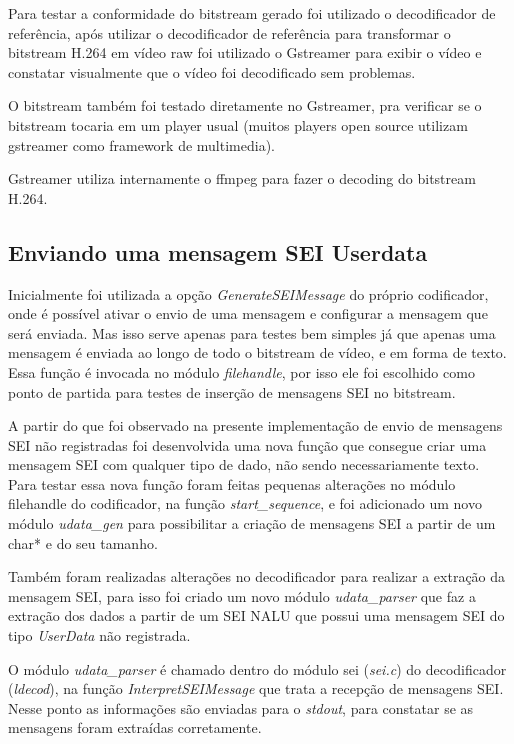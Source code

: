 Para testar a conformidade do bitstream gerado foi utilizado o decodificador de referência, após utilizar o decodificador de referência para transformar o bitstream H.264 em vídeo raw foi utilizado o Gstreamer para exibir o vídeo e constatar visualmente que o vídeo foi decodificado sem problemas.

O bitstream também foi testado diretamente no Gstreamer, pra verificar se o bitstream tocaria em um player usual (muitos players open source utilizam gstreamer como framework de multimedia). 

Gstreamer utiliza internamente o ffmpeg para fazer o decoding do bitstream H.264. 


\subsection{Enviando uma mensagem SEI Userdata}

Inicialmente foi utilizada a opção \textit{GenerateSEIMessage} do próprio codificador, onde é possível ativar o envio de uma mensagem e configurar a mensagem que será enviada. Mas isso serve apenas para testes bem simples já que apenas uma mensagem é enviada ao longo de todo o bitstream de vídeo, e em forma de texto. Essa função é invocada no módulo \textit{filehandle}, por isso ele foi escolhido como ponto de partida para testes de inserção de mensagens SEI no bitstream.

A partir do que foi observado na presente implementação de envio de mensagens SEI não registradas foi desenvolvida uma nova função que consegue criar uma mensagem SEI com qualquer tipo de dado, não sendo necessariamente texto. Para testar essa nova função foram feitas pequenas alterações no módulo filehandle do codificador, na função \textit{start\_sequence}, e foi adicionado um novo módulo \textit{udata\_gen} para possibilitar a criação de mensagens SEI a partir de um char* e do seu tamanho.

Também foram realizadas alterações no decodificador para realizar a extração da mensagem SEI, para isso foi criado um novo módulo \textit{udata\_parser} que faz a extração dos dados a partir de um SEI NALU que possui uma mensagem SEI do tipo \textit{UserData} não registrada.

O módulo \textit{udata\_parser} é chamado dentro do módulo sei (\textit{sei.c}) do decodificador (\textit{ldecod}), na função \textit{InterpretSEIMessage} que trata a recepção de mensagens SEI. Nesse ponto as informações são enviadas para o \textit{stdout}, para constatar se as mensagens foram extraídas corretamente.

